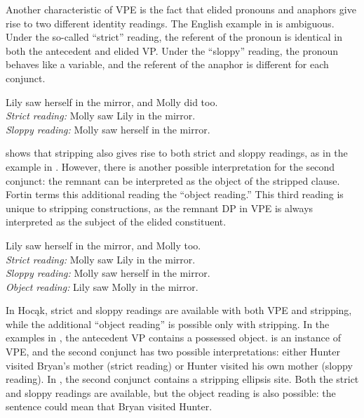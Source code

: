 \documentclass[output=paper]{LSP/langsci}
\begin{document}
Another characteristic of VPE is the fact that elided pronouns and anaphors give rise to two different identity readings. The English example in  is ambiguous. Under the so-called ``strict'' reading, the referent of the pronoun is identical in both the antecedent and elided VP. Under the ``sloppy'' reading, the pronoun behaves like a variable, and the referent of the anaphor is different for each conjunct.

\ea\label{ex:johnson:42}
Lily saw herself in the mirror, and Molly did too.\\
\textit{Strict reading:} Molly saw Lily in the mirror.\\
\textit{Sloppy reading:} Molly saw herself in the mirror.
\z

\citealt{Fortin2007} shows that stripping also gives rise to both strict and sloppy readings, as in the example in . However, there is another possible interpretation for the second conjunct: the remnant can be interpreted as the object of the stripped clause. Fortin terms this additional reading the ``object reading.'' This third reading is unique to stripping constructions, as the remnant DP in VPE is always interpreted as the subject of the elided constituent. 

\ea\label{ex:johnson:43}
Lily saw herself in the mirror, and Molly too.\\
\textit{Strict reading:} Molly saw Lily in the mirror.\\
\textit{Sloppy reading:} Molly saw herself in the mirror.\\
\textit{Object reading:} Lily saw Molly in the mirror.
\z

In Hocąk, strict and sloppy readings are available with both VPE and stripping, while the additional ``object reading'' is possible only with stripping. In the examples in , the antecedent VP contains a possessed object.  is an instance of VPE, and the second conjunct has two possible interpretations: either Hunter visited Bryan's mother (strict reading) or Hunter visited his own mother (sloppy reading). In , the second conjunct contains a stripping ellipsis site. Both the strict and sloppy readings are available, but the object reading is also possible: the sentence could mean that Bryan visited Hunter.
\end{document}
